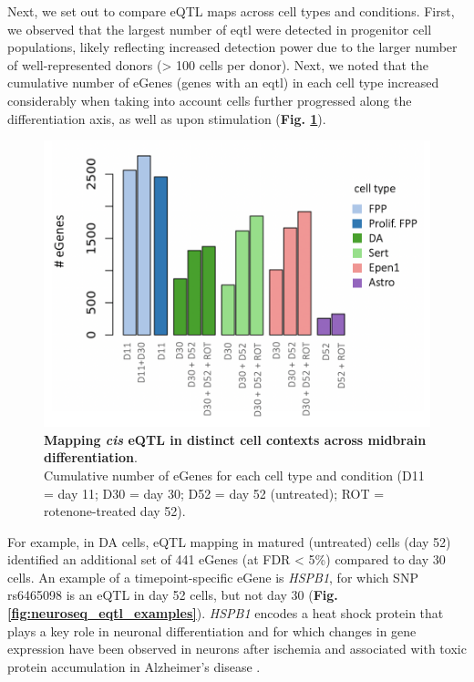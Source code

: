 Next, we set out to compare eQTL maps across cell types and conditions.
First, we observed that the largest number of \gls{eqtl} were detected in progenitor cell populations, likely reflecting increased detection power due to the larger number of well-represented donors (> 100 cells per donor). 
Next, we noted that the cumulative number of eGenes (genes with an \gls{eqtl}) in each cell type increased considerably when taking into account cells further progressed along the differentiation axis, as well as upon stimulation (\textbf{Fig. \ref{fig:neuroseq_eqtl}}). 


\begin{figure}[h]
\centering
\includegraphics[width=14cm]{Chapter5/Fig/neuroseq_eqtl_cumulative.png}
\caption[Mapping eQTL across neuronal cell types]{\textbf{Mapping \textit{cis} eQTL in distinct cell contexts across midbrain differentiation}.\\
Cumulative number of eGenes for each cell type and condition (D11 = day 11; D30 = day 30; D52 = day 52 (untreated); ROT = rotenone-treated day 52).}
\label{fig:neuroseq_eqtl}
\end{figure}

For example, in DA cells, eQTL mapping in matured (untreated) cells (day 52) identified an additional set of 441 eGenes (at FDR < 5\%) compared to day 30 cells.
An example of a timepoint-specific eGene is \textit{HSPB1}, for which SNP rs6465098 is an eQTL in day 52 cells, but not day 30 (\textbf{Fig. \ref{fig:neuroseq_eqtl_examples}}). 
\textit{HSPB1} encodes a heat shock protein that plays a key role in neuronal differentiation \cite{miller2018heat} and for which changes in gene expression have been observed in neurons after ischemia \cite{bartelt2016hspb5} and associated with toxic protein accumulation in Alzheimer's disease \cite{shimura2004binding, wilhelmus2006small}.\\

